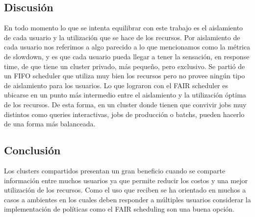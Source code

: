 \subsection{Discusión}
En todo momento lo que se intenta equilibrar con este trabajo es el aislamiento de cada usuario
y la utilización que se hace de los recursos. Por aislamiento de cada usuario nos referimos 
a algo parecido a lo que mencionamos como la métrica de slowdown, y es que cada usuario pueda
llegar a tener la sensación, en response time, de que tiene un cluster privado, más pequeño,
pero exclusivo. Se partió de un FIFO scheduler que utiliza muy bien los recursos pero no
provee ningún tipo de aislamiento para los usuarios. Lo que lograron con el FAIR scheduler
es ubicarse en un punto más intermedio entre el aislamiento y la utilización óptima de
los recursos. De esta forma, en un cluster donde tienen que convivir jobs muy distintos como
queries interactivas, jobs de producción o batchs, pueden hacerlo de una forma más 
balanceada.

\subsection{Conclusión}
Los clusters compartidos presentan un gran beneficio cuando se comparte información
entre muchos usuarios ya que permite reducir los costos y una mejor utilización
de los recursos. Como el uso que reciben se ha orientado en muchos a casos a ambientes
en los cuales deben responder a múltiples usuarios considerar la implementación
de políticas como el FAIR scheduling son una buena opción.
